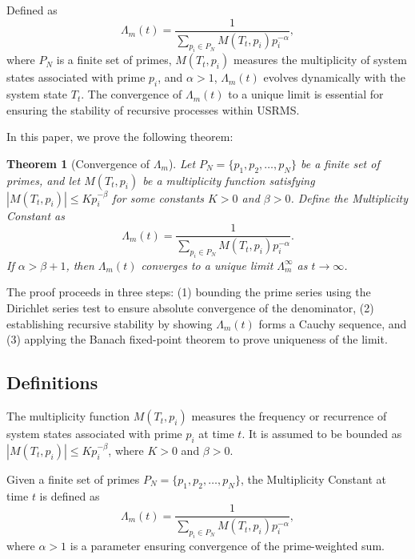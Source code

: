 \documentclass{article}
\theoremstyle{plain}
\newtheorem{theorem}{Theorem}
\begin{document}
Defined as
\[
\Lambda_m(t) = \frac{1}{\sum_{p_i \in P_N} M(T_t, p_i) p_i^{-\alpha}},
\]
where \( P_N \) is a finite set of primes, \( M(T_t, p_i) \) measures the multiplicity of system states associated with prime \( p_i \), and \( \alpha > 1 \), \( \Lambda_m(t) \) evolves dynamically with the system state \( T_t \). The convergence of \( \Lambda_m(t) \) to a unique limit is essential for ensuring the stability of recursive processes within USRMS.

In this paper, we prove the following theorem:

\begin{theorem}[Convergence of \( \Lambda_m \)]
\label{thm:convergence}
Let \( P_N = \{ p_1, p_2, \dots, p_N \} \) be a finite set of primes, and let \( M(T_t, p_i) \) be a multiplicity function satisfying \( |M(T_t, p_i)| \leq K p_i^{-\beta} \) for some constants \( K > 0 \) and \( \beta > 0 \). Define the Multiplicity Constant as
\[
\Lambda_m(t) = \frac{1}{\sum_{p_i \in P_N} M(T_t, p_i) p_i^{-\alpha}}.
\]
If \( \alpha > \beta + 1 \), then \( \Lambda_m(t) \) converges to a unique limit \( \Lambda_m^{\infty} \) as \( t \to \infty \).
\end{theorem}

The proof proceeds in three steps: (1) bounding the prime series using the Dirichlet series test to ensure absolute convergence of the denominator, (2) establishing recursive stability by showing \( \Lambda_m(t) \) forms a Cauchy sequence, and (3) applying the Banach fixed-point theorem to prove uniqueness of the limit.

\subsection{Definitions}

\begin{definition}
\label{def:multiplicity}
The multiplicity function \( M(T_t, p_i) \) measures the frequency or recurrence of system states associated with prime \( p_i \) at time \( t \). It is assumed to be bounded as \( |M(T_t, p_i)| \leq K p_i^{-\beta} \), where \( K > 0 \) and \( \beta > 0 \).
\end{definition}

\begin{definition}
\label{def:lambda_m}
Given a finite set of primes \( P_N = \{ p_1, p_2, \dots, p_N \} \), the Multiplicity Constant at time \( t \) is defined as
\[
\Lambda_m(t) = \frac{1}{\sum_{p_i \in P_N} M(T_t, p_i) p_i^{-\alpha}},
\]
where \( \alpha > 1 \) is a parameter ensuring convergence of the prime-weighted sum.
\end{definition}
\end{document}

